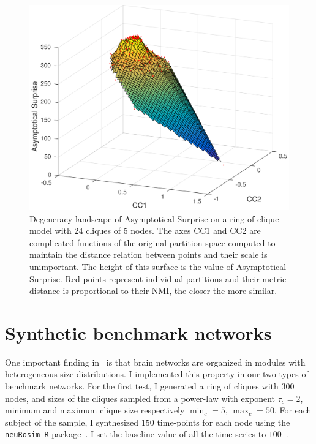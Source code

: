 \begin{figure}[!htb]
\centering
\includegraphics[width=1.0\textwidth]{images/filtered_asymp_surp_ring_cliques_5_24_200.png}
\caption{Degeneracy landscape of Asymptotical Surprise on a ring of clique model with 24 cliques of 5 nodes.
The axes CC1 and CC2 are complicated functions of the original partition space computed to maintain the distance relation between points and their scale is unimportant.
The height of this surface is the value of Asymptotical Surprise.
Red points represent individual partitions and their metric distance is proportional to their NMI, the closer the more similar.}
\label{fig:degeneracy_asymptotical_surprise}
\end{figure}


\section{Synthetic benchmark networks}
One important finding in~\cite{nicolini2016} is that brain networks are organized in modules with heterogeneous size distributions.
I implemented this property in our two types of benchmark networks.
For the first test, I generated a ring of cliques with $300$ nodes, and sizes of the cliques sampled from a power-law with exponent $\tau_c=2$, minimum and maximum clique size respectively $\min_c=5$, $\max_c=50$.
For each subject of the sample, I synthesized $150$ time-points for each node using the \texttt{neuRosim R} package~\cite{neurosim2011}.
I set the baseline value of all the time series to $100$~\cite{welvaert2013}.

